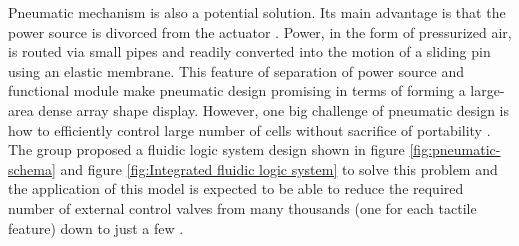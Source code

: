 Pneumatic mechanism is also a potential solution.
Its main advantage is that the power source is divorced from the actuator \cite{russomanno_design_2015}.
Power, in the form of pressurized air, is routed via small pipes and readily converted into the motion of a sliding pin using an elastic membrane.
This feature of separation of power source and functional module make pneumatic design promising in terms of forming a large-area dense array shape display.
However, one big challenge of pneumatic design is how to efficiently control large number of cells without sacrifice of portability \cite{russomanno_model-based_2017}.
The group proposed a fluidic logic system design shown in figure \ref{fig:pneumatic-schema} and figure \ref{fig:Integrated fluidic logic system} to solve this problem and the application of this model is expected to be able to reduce the required number of external control valves from many thousands (one for each tactile feature) down to just a few \cite{russomanno_design_2015}.


